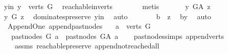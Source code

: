 \begin{isabellebody}
\ y{\isacharunderscore}{\kern0pt}in{\isacharcolon}{\kern0pt}\ {\isachardoublequoteopen}y\ {\isasymin}\ verts\ G{\isachardoublequoteclose}\ \isamarkupfalse%
\ reachable{}{\isacharunderscore}{\kern0pt}in{\isacharunderscore}{\kern0pt}verts{\isacharparenleft}{\kern0pt}{}{\isacharparenright}{\kern0pt}\isanewline
\ \ \ \ \ \ \isamarkupfalse%
\ {\isacharparenleft}{\kern0pt}metis{\isacharparenright}{\kern0pt}\ \isanewline
\ \ \ \ \isamarkupfalse%
\ {\isachardoublequoteopen}y\ {\isasymrightarrow}\isactrlbsub G{\isacharunderscore}{\kern0pt}A\isactrlesub \ z{\isachardoublequoteclose}\isanewline
\ \ \ \ \isamarkupfalse%
\ \isamarkupfalse%
\ {\isachardoublequoteopen}y\ {\isasymrightarrow}\isactrlbsub G\isactrlesub \ z{\isachardoublequoteclose}\ \isamarkupfalse%
\ dominates{\isacharunderscore}{\kern0pt}preserve\ y{\isacharunderscore}{\kern0pt}in\ \isamarkupfalse%
\ auto\isanewline
\ \ \ \ \isamarkupfalse%
\ \isamarkupfalse%
\ {\isachardoublequoteopen}b\ {\isasymrightarrow}\isactrlsup {\isacharplus}{\kern0pt}\ z{\isachardoublequoteclose}\ \isamarkupfalse%
\ b{\isacharunderscore}{\kern0pt}y\ \isamarkupfalse%
\ auto\isanewline
\ \ \isamarkupfalse%
\isanewline
{}\isamarkupfalse%
%
\endisatagproof
{\isafoldproof}%
%
\isadelimproof
\isanewline
%
\endisadelimproof
\isanewline
{}\isamarkupfalse%
\ {\isacharparenleft}{\kern0pt}\ Append{\isacharunderscore}{\kern0pt}One{\isacharparenright}{\kern0pt}\ append{\isacharunderscore}{\kern0pt}past{\isacharunderscore}{\kern0pt}nodes{\isacharcolon}{\kern0pt}\isanewline
\ \ \ {\isachardoublequoteopen}a\ {\isasymin}\ verts\ G{\isachardoublequoteclose}\isanewline
\ \ \ {\isachardoublequoteopen}past{\isacharunderscore}{\kern0pt}nodes\ G\ a\ {\isacharequal}{\kern0pt}\ past{\isacharunderscore}{\kern0pt}nodes\ G{\isacharunderscore}{\kern0pt}A\ a{\isachardoublequoteclose}\isanewline
%
\isadelimproof
\ \ %
\endisadelimproof
%
\isatagproof
{}\isamarkupfalse%
\ past{\isacharunderscore}{\kern0pt}nodes{\isachardot}{\kern0pt}simps\ append{\isacharunderscore}{\kern0pt}verts\ \isamarkupfalse%
\ \isanewline
\ \ \ \ assms\ reachable{}{\isacharunderscore}{\kern0pt}preserve\ append{\isacharunderscore}{\kern0pt}not{\isacharunderscore}{\kern0pt}reached{\isacharunderscore}{\kern0pt}all\ \isamarkupfalse%

\end{isabellebody}

